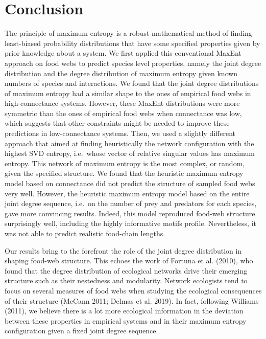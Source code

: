 \documentclass[10pt,oneside]{article}
\begin{document}
\hypertarget{conclusion}{%
\section{Conclusion}\label{conclusion}}

The principle of maximum entropy is a robust mathematical method of
finding least-biased probability distributions that have some specified
properties given by prior knowledge about a system. We first applied
this conventional MaxEnt approach on food webs to predict species level
properties, namely the joint degree distribution and the degree
distribution of maximum entropy given known numbers of species and
interactions. We found that the joint degree distributions of maximum
entropy had a similar shape to the ones of empirical food webs in
high-connectance systems. However, these MaxEnt distributions were more
symmetric than the ones of empirical food webs when connectance was low,
which suggests that other constraints might be needed to improve these
predictions in low-connectance systems. Then, we used a slightly
different approach that aimed at finding heuristically the network
configuration with the highest SVD entropy, i.e.~whose vector of
relative singular values has maximum entropy. This network of maximum
entropy is the most complex, or random, given the specified structure.
We found that the heuristic maximum entropy model based on connectance
did not predict the structure of sampled food webs very well. However,
the heuristic maximum entropy model based on the entire joint degree
sequence, i.e.~on the number of prey and predators for each species,
gave more convincing results. Indeed, this model reproduced food-web
structure surprisingly well, including the highly informative motifs
profile. Nevertheless, it was not able to predict realistic food-chain
lengths.

Our results bring to the forefront the role of the joint degree
distribution in shaping food-web structure. This echoes the work of
Fortuna et al. (2010), who found that the degree distribution of
ecological networks drive their emerging structure such as their
nestedness and modularity. Network ecologists tend to focus on several
measures of food webs when studying the ecological consequences of their
structure (McCann 2011; Delmas et al. 2019). In fact, following Williams
(2011), we believe there is a lot more ecological information in the
deviation between these properties in empirical systems and in their
maximum entropy configuration given a fixed joint degree sequence.
\end{document}
